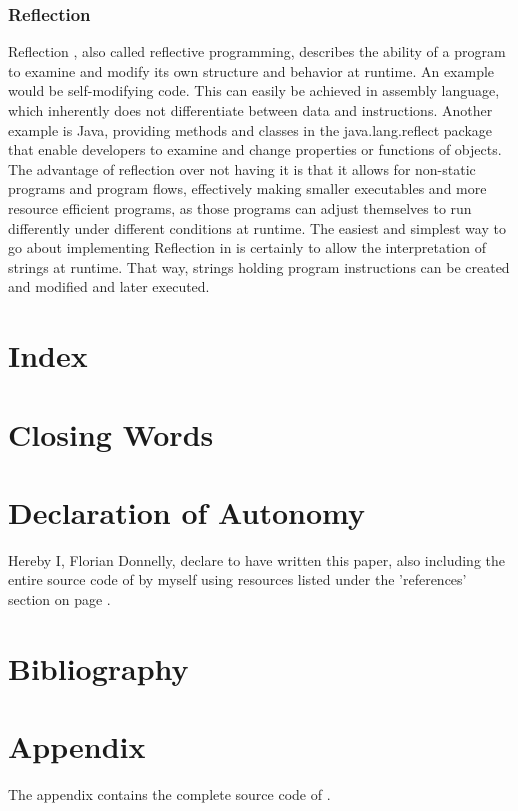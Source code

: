 \documentclass[12pt,a4paper]{article}
\newcommand{\code}[3] {
    \lstset{language=C,numbers=left,basicstyle=\scriptsize,
        frame=single,title=#1,keywordstyle=\color{blue},stepnumber=5,
        stringstyle=\color{green},commentstyle=\color{gray},
        morecomment=[l][\color{magenta}]{\#}}
    
}
\newcommand{\cte}[1] {
    \cite{#1}
}
\newcommand{\pagelabel}[1]{\phantomsection\label{#1}}
\begin{document}
\subsubsection{Reflection}
Reflection\cte{reflection}, also called reflective programming, describes
the ability of a program to examine and modify its own structure and behavior 
at runtime. An example would be self-modifying code. This can easily be
achieved in assembly language, which inherently does not differentiate between
data and instructions.
Another example is Java, providing methods and classes in the java.lang.reflect
package that enable developers to examine and change properties or functions
of objects.
The advantage of reflection over not having it is that it allows for non-static
programs and program flows, effectively making smaller executables and more
resource efficient programs, as those programs can adjust themselves to run
differently under different conditions at runtime.
The easiest and simplest way to go about implementing Reflection in \name is
certainly to allow the interpretation of strings at runtime. That way, strings
holding program instructions can be created and modified and later executed.

\section{Index}
\section{Closing Words}
\section{Declaration of Autonomy}
Hereby I, Florian Donnelly, declare to have written this paper, also including
the entire source code of \name by myself using resources listed under the
'references' section on page \pageref{bibliography}.

\newpage\section{Bibliography}
\pagelabel{bibliography}\printbibliography[heading=none]


\newpage\section{Appendix}
The appendix contains the complete source code of \name.

\end{document}
